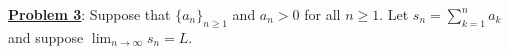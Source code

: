 \documentclass[12pt]{article}
\begin{document}
%
%
%
%
%
%
%
%
%

\textbf{\underline{Problem 3}}: Suppose that $\displaystyle\{a_n\}_{n \geq 1}$ and $a_n > 0$ for all $n \geq 1$.  Let $s_n =\displaystyle  \sum^n_{k=1} a_k$ and suppose $\displaystyle \lim_{n \rightarrow \infty} s_n = L$.
\vspace{3mm}
\end{document}
